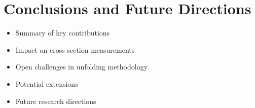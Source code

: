 \chapter{Conclusions and Future Directions}
\begin{itemize}
    \item Summary of key contributions
    \item Impact on cross section measurements
    \item Open challenges in unfolding methodology
    \item Potential extensions
    \item Future research directions
\end{itemize}